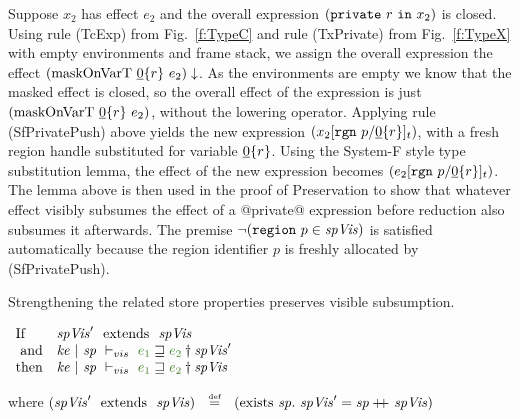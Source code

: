 \noindent
Suppose $x_2$ has effect $e_2$ and the overall expression $(\texttt{private}~ r~ \texttt{in}~ x_2)$ is closed. Using rule (TcExp) from Fig.~\ref{f:TypeC} and rule (TxPrivate) from Fig.~\ref{f:TypeX} with empty environments and frame stack, we assign the overall expression the effect $(\textrm{maskOnVarT}~ \underline{0}\{r\}~ e_2)\downarrow$. As the environments are empty we know that the masked effect is closed, so the overall effect of the expression is just $(\textrm{maskOnVarT}~ \underline{0}\{r\}~ e_2)$, without the lowering operator. Applying rule (SfPrivatePush) above yields the new expression $(x_2[\texttt{rgn}~ p/\underline{0}\{r\}]_t)$, with a fresh region handle substituted for variable $\underline{0}\{r\}$. Using the System-F style type substitution lemma, the effect of the new expression becomes $(e_2[\texttt{rgn}~ p/\underline{0}\{r\}]_t)$. The lemma above is then used in the proof of Preservation to show that whatever effect visibly subsumes the effect of a @private@ expression before reduction also subsumes it afterwards. The premise $\neg(\texttt{region}~ p \in \mathit{spVis})$ is satisfied automatically because the region identifier $p$ is freshly allocated by (SfPrivatePush).
\qqed

\begin{lemma} Strengthening the related store properties preserves visible subsumption.
\end{lemma}
$
\begin{array}{ll}
    \pIf        & \mspVis' ~~\trm{extends}~~ \mspVis
\\  ~\pand      & \SubsVisibleT{\mke}{\msp}{\mspVis'}{e_1}{e_2}
\\  \pthen      & \SubsVisibleT{\mke}{\msp}{\mspVis} {e_1}{e_2}
\end{array}
$

\vspace{1ex}
where $(\mspVis' ~~\trm{extends}~~ \mspVis) 
        ~~\eqdef~~ (\trm{exists}~ \msp.~ \mspVis' = \msp \doubleplus \mspVis)$
\qqed


